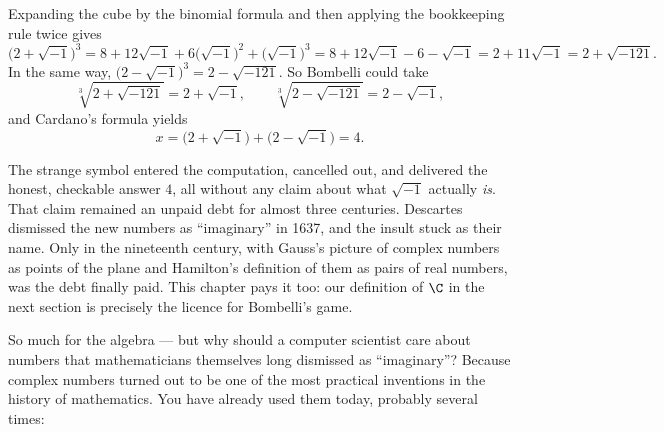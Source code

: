 \begin{example}
Expanding the cube by the binomial formula and then applying the bookkeeping rule twice gives
\[
\big(2+\sqrt{-1}\big)^3 = 8 + 12\sqrt{-1} + 6\big(\sqrt{-1}\big)^2 + \big(\sqrt{-1}\big)^3
= 8 + 12\sqrt{-1} - 6 - \sqrt{-1} = 2 + 11\sqrt{-1} = 2+\sqrt{-121}.
\]
In the same way, $\big(2-\sqrt{-1}\big)^3 = 2-\sqrt{-121}$. So Bombelli could take
\[
\sqrt[3]{2+\sqrt{-121}} = 2+\sqrt{-1}, \qquad \sqrt[3]{2-\sqrt{-121}} = 2-\sqrt{-1},
\]
and Cardano's formula yields
\[
x = \big(2+\sqrt{-1}\big) + \big(2-\sqrt{-1}\big) = 4.
\]
\end{example}

\noindent The strange symbol entered the computation, cancelled out, and delivered the honest, checkable
answer $4$, all without any claim about what $\sqrt{-1}$ actually \emph{is}. That claim remained an unpaid
debt for almost three centuries. Descartes dismissed the new numbers as ``imaginary'' in 1637, and the
insult stuck as their name. Only in the nineteenth century, with Gauss's picture of complex numbers as
points of the plane and Hamilton's definition of them as pairs of real numbers, was the debt finally paid.
This chapter pays it too: our definition of $\C$ in the next section is precisely the licence for
Bombelli's game.

So much for the algebra — but why should a computer scientist care about numbers that mathematicians
themselves long dismissed as ``imaginary''? Because complex numbers turned out to be one of the most
practical inventions in the history of mathematics. You have already used them today, probably several
times:

